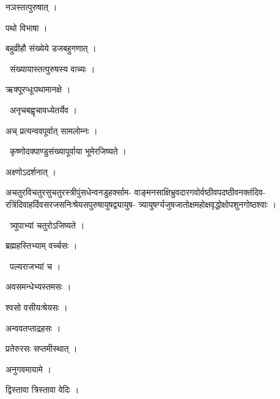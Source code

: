 \documentclass[10pt, openany, oneside]{book}
\begin{document}
\noindent नञस्तत्पुरुषात् ।

\noindent पथो विभाषा ।

\noindent बहुव्रीहौ संख्येये डजबहुगणात् ।

\par\noindent\hspace{1.5em}{\vps वा॰}~{\qt संख्यायास्तत्पुरुषस्य वाच्यः ।}

\noindent ऋक्पूरप्धूःपथामानक्षे ।

\par\noindent\hspace{1.5em}{\vps वा॰}~{\qt अनृचबह्वृचावध्येतर्येव ।}

\noindent अच् प्रत्यन्ववपूर्वात् सामलोम्नः ।

\par\noindent\hspace{1.5em}{\vps वा॰}~{\qt कृष्णोदक्पाण्डुसंख्यापूर्वाया भूमेरजिष्यते ।}

\noindent अक्ष्णोऽदर्शनात् ।

\noindent अचतुरविचतुरसुचतुरस्त्रीपुंसधेन्वनडुहर्क्साम- वाङ्मनसाक्षिभ्रुवदारगवोर्वष्ठीवपदष्ठीवनक्तंदिव- \\ रत्रिंदिवाहर्दिवसरजसनिःश्रेयसपुरुषायुषद्व्यायुष- त्र्यायुषर्ग्यजुषजातोक्षमहोक्षवृद्धोक्षोपशुनगोष्ठश्वाः ।

\par\noindent\hspace{1.5em}{\vps वा॰}~{\qt त्र्युपाभ्यां चतुरोऽजिष्यते ।}

\noindent ब्रह्महस्तिभ्याम् वर्च्चसः ।

\par\noindent\hspace{1.5em}{\vps वा॰}~{\qt पल्यराजभ्यां च ।}

\noindent अवसमन्धेभ्यस्तमसः ।

\noindent श्वसो वसीयःश्रेयसः ।

\noindent अन्ववतप्ताद्रहसः ।

\noindent प्रतेरुरसः सप्तमीस्थात् ।

\noindent अनुगवमायामे ।

\noindent द्विस्तावा त्रिस्तावा वेदिः ।
\end{document}
